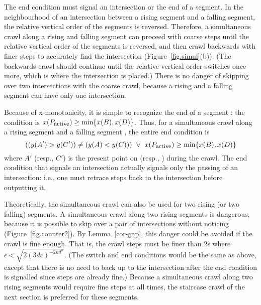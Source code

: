 The end condition must signal an intersection or the end of a segment.
In the neighbourhood of an intersection between a rising segment and a falling segment, 
the relative vertical order of the segments is reversed.
Therefore, a simultaneous crawl along a rising and falling segment can proceed with coarse steps 
until the relative vertical order of the segments is reversed, and then crawl backwards
with finer steps to accurately find the intersection 
(Figure~\ref{fig.simul}(b)).
(The backwards
	crawl should continue until the relative vertical order switches once more, which 
	is where the intersection is placed.)
There is no danger of skipping over two intersections with the coarse crawl, because
a rising and a falling segment can have only one intersection.

Because of x-monotonicity, it is simple to recognize the end of a segment : 
the condition is $x(P_{\mbox{\footnotesize{active}}}) \geq \mbox{min} \{x(B),x(D)\}$.
Thus, for a simultaneous crawl along a rising segment  and a falling segment ,
the entire end condition is 
\[ ((y(A') > y(C')) \neq (y(A) < y(C))) \ \vee \ 
x(P_{\mbox{\footnotesize{active}}}) \geq \mbox{min} \{x(B),x(D)\} \]
where $A'$ (resp., $C'$) is the present point on \arc{AB} (resp., ) during the crawl.
The end condition that signals an intersection actually signals only the passing of an 
intersection: i.e., one must retrace steps back to the intersection before outputting it.

Theoretically, the simultaneous crawl can also be used for two rising (or two falling) segments.
A simultaneous crawl along two rising segments is dangerous, 
because it is possible to skip over a pair of intersections without noticing 
(Figure~\ref{fig.counter2}).
By Lemma~\ref{cor-gap}, this danger could be avoided if the crawl is fine enough.
That is, the crawl steps must be finer than $2\epsilon$ where 
$\epsilon < \sqrt{2 (3dc)^{-2nd^{n}}}$.
(The switch and end conditions would be the same as above, except that there is no need to 
back up to the intersection after the end condition is signalled since steps are already fine.)
Because a simultaneous crawl along two rising segments would require fine steps at all times, 
the staircase crawl of the next section is preferred for these segments.


